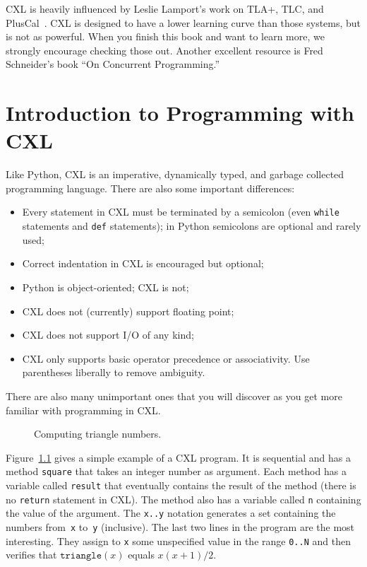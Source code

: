 \documentclass{report}
\newenvironment{code}{
\tcolorbox
}{
\endtcolorbox
}
\begin{document}
CXL is heavily influenced by Leslie Lamport's work on
TLA+, TLC, and PlusCal~\cite{}.
CXL is designed to have a lower learning curve than those
systems, but is not as powerful.  When you finish this book
and want to learn more, we strongly encourage checking
those out.
Another excellent resource is Fred Schneider's book ``On
Concurrent Programming.''

\chapter{Introduction to Programming with CXL}

Like Python, CXL is an imperative,
dynamically typed, and garbage collected programming language.
There are also some important differences:
\begin{itemize}
\item Every statement in CXL must be terminated by a semicolon
(even \texttt{while} statements and \texttt{def} statements);
in Python semicolons are optional and rarely used;
\item Correct indentation in CXL is encouraged but optional;
\item Python is object-oriented; CXL is not;
\item CXL does not (currently) support floating point;
\item CXL does not support I/O of any kind;
\item CXL only supports basic operator precedence or associativity.
Use parentheses liberally to remove ambiguity.
\end{itemize}
There are also many unimportant ones that you will discover as
you get more familiar with programming in CXL.

\begin{figure}
\begin{code}
\end{code}
\caption{Computing triangle numbers.}
\label{fig:triangle}
\end{figure}

Figure~\ref{fig:triangle} gives a simple example of a CXL program.
It is sequential and has a method \texttt{square} that takes
an integer number as argument.  Each method has a variable called
\texttt{result} that eventually contains the result of the
method (there is no \texttt{return} statement in CXL).  The method
also has a variable called \texttt{n} containing the value of the
argument.  The \texttt{x..y} notation generates a set containing the numbers
from~\texttt{x} to~\texttt{y} (inclusive).  The last two lines in the program are
the most interesting.
They assign to \texttt{x} some unspecified value in the range \texttt{0..N}
and then verifies that $\mathtt{triangle}(x)$ equals $x(x+1)/2$.
\end{document}

